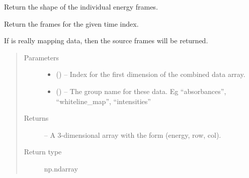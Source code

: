 \documentclass[letterpaper,10pt,english]{sphinxmanual}
\begin{document}
\begin{fulllineitems}
\begin{fulllineitems}
\begin{quote}
\begin{description}
\begin{itemize}
\end{itemize}

\end{description}\end{quote}

\end{fulllineitems}


\begin{fulllineitems}
\label{\detokenize{xanespy:xanespy.xanes_frameset.XanesFrameset.frame_shape}}
Return the shape of the individual energy frames.

\end{fulllineitems}


\begin{fulllineitems}
\label{\detokenize{xanespy:xanespy.xanes_frameset.XanesFrameset.frames}}
Return the frames for the given time index.

If  is really mapping data, then the source
frames will be returned.
\begin{quote}\begin{description}
\item[{Parameters}] \leavevmode\begin{itemize}
\item {} 
 () -- Index for the first dimension of the combined data array.

\item {} 
 () -- The group name for these data. Eg ``absorbances'',
``whiteline\_map'', ``intensities''

\end{itemize}

\item[{Returns}] \leavevmode
{} -- A 3-dimensional array with the form (energy, row, col).

\item[{Return type}] \leavevmode
np.ndarray

\end{description}\end{quote}


\end{fulllineitems}
\end{fulllineitems}
\end{document}
